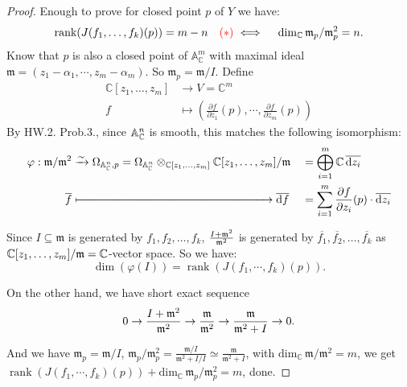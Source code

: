 \begin{proof}
    Enough to prove for closed point $p$ of $Y$ we have:
    $$\text{rank}(J(f_1, \ldots, f_k)(p)) = m-n \quad \textcolor{red}{(*)}\iff \quad \dim_{\mathbb{C}} \mathfrak{m}_{p}/\mathfrak{m}_p^2 = n.$$
    Know that $p$ is also a closed point of $\mathbb{A}^{m}_{\mathbb{C}}$ with maximal ideal $\mathfrak{m} = (z_1 - \alpha_1, \cdots, z_m - \alpha_m)$. So $\mathfrak{m}_p = \mathfrak{m}/I$.
    Define
    \begin{align*}
        \mathbb{C}[z_1, \ldots, z_m] & \longrightarrow V = \mathbb{C}^m                                                                          \\
        f                            & \longmapsto \left( \frac{\partial f}{\partial z_1}(p), \cdots, \frac{\partial f}{\partial z_m}(p) \right)
    \end{align*}
    By HW.2. Prob.3., since $\mathbb{A}^n_{\mathbb{C}}$ is smooth, this matches the following isomorphism:
    \begin{alignat*}{3}
        \varphi: \m/\m^2 & \xrightarrow{\sim}   \Omega_{\A^n_\C,p}=\Omega_{\A^n_\C}\otimes_{\C[z_1, \ldots, z_m]} \C[z_1, \ldots, z_m]/\mathfrak{m} &  & =\bigoplus_{i=1}^m \C\, \overline{\mathrm{d}z_i}                                 \\
        \overline{f}     & \xmapsto{\hspace*{17em}}  \overline{\mathrm{d}f}                                                                         &  & = \sum_{i=1}^m \frac{\partial f}{\partial z_i}(p) \cdot \overline{\mathrm{d}z_i} \\
    \end{alignat*}

    Since $I\subseteq \mathfrak{m}$ is generated by $f_{1},f_{2},\dots,f_{k}$, $\frac{I+\mathfrak{m}^2}{\mathfrak{m}^2}$ is generated by $\overline{f_{1}},\overline{f_{2}},\dots,\overline{f_{k}}$ as $\mathbb{C}[z_1, \ldots, z_m]/\mathfrak{m} = \mathbb{C}$-vector space. So we have:
    $$\dim(\varphi(I)) = \operatorname{rank} \left( J(f_1, \cdots, f_k)(p) \right).$$

    On the other hand, we have short exact sequence
    $$0\rightarrow \frac{I+\mathfrak{m}^2}{\mathfrak{m}^2}\rightarrow \frac{\mathfrak{m}}{\mathfrak{m}^2}\rightarrow \frac{\mathfrak{m}}{\mathfrak{m}^2 + I}\rightarrow 0.$$

    And we have $\mathfrak{m}_{p}=\mathfrak{m} /I$, $\mathfrak{m}_{p} /\mathfrak{m}_{p}^{2}=\frac{\mathfrak{m}/I}{\mathfrak{m}^{2}+I /I}\simeq \frac{\mathfrak{m}}{\mathfrak{m}^{2}+I}$,  with $\mathrm{dim}_{\mathbb{C}}\, \mathfrak{m} /\mathfrak{m}^{2}=m$, we get $\operatorname{rank} \left( J(f_1, \cdots, f_k)(p) \right)+\mathrm{dim}_{\mathbb{C}}\,\mathfrak{m}_{p} /\mathfrak{m}_{p}^{2}=m$, done.
\end{proof}
\quad

